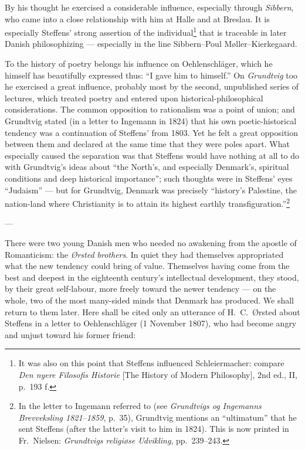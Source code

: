 \documentclass[12pt,a4paper]{book}
\newcommand{\opage}[1]{\marginnote{\footnotesize\textit{[#1]}}}
\begin{document}
\opage{47}By his thought he exercised a considerable influence, especially through \emph{Sibbern},
who came into a close relationship with him at Halle and at Breslau. It is especially
Steffens' strong assertion of the individual\footnote{It was also on this point that
Steffens influenced Schleiermacher: compare \emph{Den nyere Filosofis Historie} [The
History of Modern Philosophy], 2nd ed., II, p.~193 f.} that is traceable in later
Danish philosophizing --- especially in the line Sibbern--Poul Møller--Kierkegaard.

To the history of poetry belongs his influence on Oehlenschläger, which he himself
has beautifully expressed thus: ``I gave him to himself.'' On \emph{Grundtvig} too he
exercised a great influence, probably most by the second, unpublished series of
lectures, which treated poetry and entered upon historical-philosophical
considerations. The common opposition to rationalism was a point of union; and
Grundtvig stated (in a letter to Ingemann in 1824) that his own poetic-historical
tendency was a continuation of Steffens' from 1803. Yet he felt a great opposition
between them and declared at the same time that they were poles apart. What
especially caused the separation was that Steffens would have nothing at all to do
with Grundtvig's ideas about ``the North's, and especially Denmark's, spiritual
conditions and deep historical importance''; such thoughts were in Steffens' eyes
``Judaism'' --- but for Grundtvig, Denmark was precisely ``history's Palestine, the
nation-land where Christianity is to attain its highest earthly
transfiguration.''\footnote{In the letter to Ingemann referred to (see
\emph{Grundtvigs og Ingemanns Brevveksling 1821--1859}, p.~35), Grundtvig mentions
an ``ultimatum'' that he sent Steffens (after the latter's visit to him in 1824).
This is now printed in Fr.\ Nielsen: \emph{Grundtvigs religiøse Udvikling},
pp.~239--243.}

\begin{center}---\end{center}

There were two young Danish men who needed no awakening from the apostle of
Romanticism: the \emph{Ørsted brothers}. In quiet they had themselves appropriated what the
new tendency \opage{48}could bring of value. Themselves having come from the best and deepest
in the eighteenth century's intellectual development, they stood, by their great
self-labour, more freely toward the newer tendency --- on the whole, two of the most
many-sided minds that Denmark has produced. We shall return to them later. Here
shall be cited only an utterance of H.\ C.\ Ørsted about Steffens in a letter to
Oehlenschläger (1 November 1807), who had become angry and unjust toward his former
friend:
\end{document}
